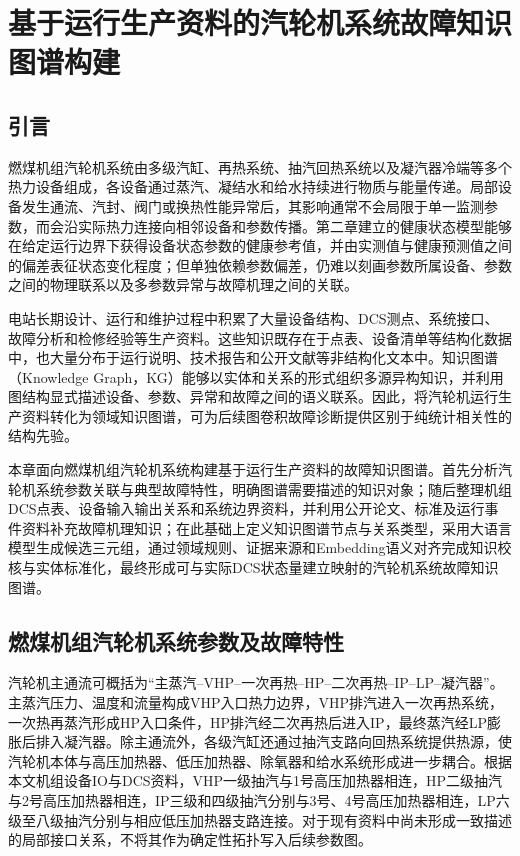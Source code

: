\section{基于运行生产资料的汽轮机系统故障知识图谱构建}
\label{sec:knowledge_graph_v6}

\subsection{引言}

燃煤机组汽轮机系统由多级汽缸、再热系统、抽汽回热系统以及凝汽器冷端等多个热力设备组成，各设备通过蒸汽、凝结水和给水持续进行物质与能量传递。局部设备发生通流、汽封、阀门或换热性能异常后，其影响通常不会局限于单一监测参数，而会沿实际热力连接向相邻设备和参数传播。第二章建立的健康状态模型能够在给定运行边界下获得设备状态参数的健康参考值，并由实测值与健康预测值之间的偏差表征状态变化程度；但单独依赖参数偏差，仍难以刻画参数所属设备、参数之间的物理联系以及多参数异常与故障机理之间的关联。

电站长期设计、运行和维护过程中积累了大量设备结构、DCS测点、系统接口、故障分析和检修经验等生产资料。这些知识既存在于点表、设备清单等结构化数据中，也大量分布于运行说明、技术报告和公开文献等非结构化文本中。知识图谱（Knowledge Graph，KG）能够以实体和关系的形式组织多源异构知识，并利用图结构显式描述设备、参数、异常和故障之间的语义联系\cite{Hogan2021KnowledgeGraphs}。因此，将汽轮机运行生产资料转化为领域知识图谱，可为后续图卷积故障诊断提供区别于纯统计相关性的结构先验。

本章面向燃煤机组汽轮机系统构建基于运行生产资料的故障知识图谱。首先分析汽轮机系统参数关联与典型故障特性，明确图谱需要描述的知识对象；随后整理机组DCS点表、设备输入输出关系和系统边界资料，并利用公开论文、标准及运行事件资料补充故障机理知识；在此基础上定义知识图谱节点与关系类型，采用大语言模型生成候选三元组，通过领域规则、证据来源和Embedding语义对齐完成知识校核与实体标准化，最终形成可与实际DCS状态量建立映射的汽轮机系统故障知识图谱。

\subsection{燃煤机组汽轮机系统参数及故障特性}
\label{subsec:turbine_fault_characteristics_v6}

汽轮机主通流可概括为“主蒸汽--VHP--一次再热--HP--二次再热--IP--LP--凝汽器”。主蒸汽压力、温度和流量构成VHP入口热力边界，VHP排汽进入一次再热系统，一次热再蒸汽形成HP入口条件，HP排汽经二次再热后进入IP，最终蒸汽经LP膨胀后排入凝汽器。除主通流外，各级汽缸还通过抽汽支路向回热系统提供热源，使汽轮机本体与高压加热器、低压加热器、除氧器和给水系统形成进一步耦合。根据本文机组设备IO与DCS资料，VHP一级抽汽与1号高压加热器相连，HP二级抽汽与2号高压加热器相连，IP三级和四级抽汽分别与3号、4号高压加热器相连，LP六级至八级抽汽分别与相应低压加热器支路连接。对于现有资料中尚未形成一致描述的局部接口关系，不将其作为确定性拓扑写入后续参数图。

